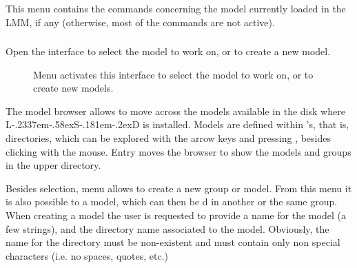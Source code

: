 \documentclass [11pt,a4paper] {book}
\def\LsD{{L\kern-.2337em\lower-.58ex\hbox{S}\kern-.181em\lower-.2ex\hbox{D}}\xspace}
\begin{document}
This menu contains the commands concerning the model currently loaded in the LMM, if any (otherwise, most of the commands are not active).

\subsubsection{}

Open the interface to select the model to work on, or to create a new model.

\begin{figure}[ht]
  \centering
  \caption{Menu  activates this interface to select the model to work on, or to create new models.}
  \label{fig:browsemodels}
\end{figure}

The model browser allows to move across the models available in the disk where \LsD is installed. Models are defined within 's, that is, directories, which can be explored with the arrow keys and pressing , besides clicking with the mouse. Entry  moves the browser to show the models and groups in the upper directory.

Besides selection, menu  allows to create a new group or model. From this menu it is also possible to  a model, which can then be d in another or the same group. When creating a model the user is requested to provide a name for the model (a few strings), and the directory name associated to the model. Obviously, the name for the directory must be non-existent and must contain only non special characters (i.e. no spaces, quotes, etc.)

\subsubsection{}\label{sssec:run}
\end{document}
